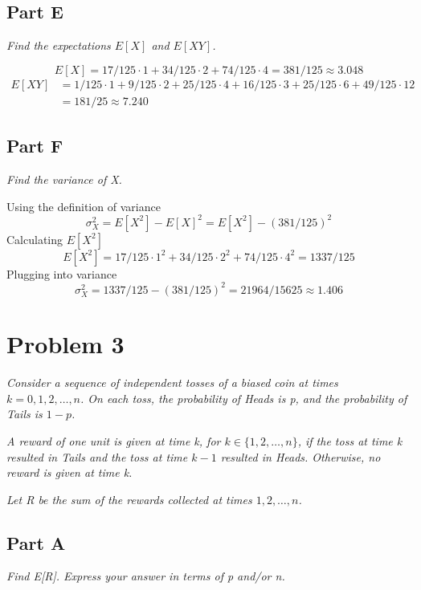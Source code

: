 \documentclass{article}
\begin{document}
\subsection*{Part E}

\textit{Find the expectations $ E[X] $ and $ E[XY] $.}

$$ E[X] = 17/125 \cdot 1 + 34/125 \cdot 2 + 74/125 \cdot 4 = 381/125 \approx
3.048 $$
\begin{align*}
    E[XY] &= 1/125 \cdot 1 + 9/125 \cdot 2 + 25/125 \cdot 4 + 16/125 \cdot 3
    + 25/125 \cdot 6 + 49/125 \cdot 12 \\
    &= 181/25 \approx 7.240
\end{align*}

\subsection*{Part F}

\textit{Find the variance of X.}

\bigbreak

Using the definition of variance
$$ \sigma_X^2 = E[X^2] - E[X]^2 = E[X^2] - (381/125)^2 $$
Calculating $ E[X^2] $
$$ E[X^2] = 17/125 \cdot 1^2 + 34/125 \cdot 2^2 + 74/125 \cdot 4^2 = 1337/125 $$
Plugging into variance
$$ \sigma_X^2 = 1337/125 - (381/125)^2 = 21964/15625 \approx 1.406 $$

\section*{Problem 3}

\textit{Consider a sequence of independent tosses of a biased coin at times $
k = 0, 1, 2, \ldots , n $. On each toss, the probability of Heads is p, and
the probability of Tails is $ 1 - p $.}

\textit{A reward of one unit is given at time k, for $ k \in \{ 1, 2, \ldots
, n \} $, if the toss at time k resulted in Tails and the toss at time $ k -
1 $ resulted in Heads. Otherwise, no reward is given at time k.}

\textit{Let R be the sum of the rewards collected at times $ 1, 2, \ldots, n
$.}

\subsection*{Part A}

\textit{Find E[R]. Express your answer in terms of p and/or n.}

\bigbreak
\end{document}
